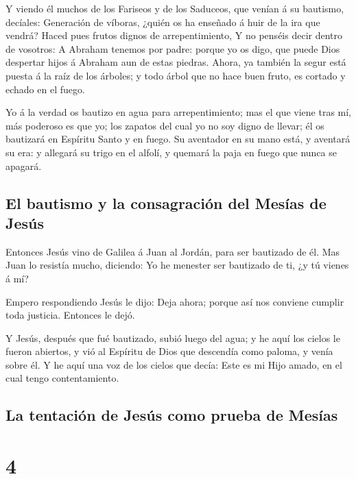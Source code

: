  Y viendo él muchos de los Fariseos y de los Saduceos, que
venían á su bautismo, decíales: Generación de víboras, ¿quién os ha
enseñado á huir de la ira que vendrá?  Haced pues frutos
dignos de arrepentimiento,  Y no penséis decir dentro de
vosotros: A Abraham tenemos por padre: porque yo os digo, que puede Dios
despertar hijos á Abraham aun de estas piedras.  Ahora,
ya también la segur está puesta á la raíz de los árboles; y todo árbol
que no hace buen fruto, es cortado y echado en el fuego.

 Yo á la verdad os bautizo en agua para arrepentimiento;
mas el que viene tras mí, más poderoso es que yo; los zapatos del cual
yo no soy digno de llevar; él os bautizará en Espíritu Santo y en fuego.
 Su aventador en su mano está, y aventará su era: y
allegará su trigo en el alfolí, y quemará la paja en fuego que nunca se
apagará.

\hypertarget{el-bautismo-y-la-consagraciuxf3n-del-mesuxedas-de-jesuxfas}{%
\subsection{El bautismo y la consagración del Mesías de
Jesús}\label{el-bautismo-y-la-consagraciuxf3n-del-mesuxedas-de-jesuxfas}}

 Entonces Jesús vino de Galilea á Juan al Jordán, para
ser bautizado de él.  Mas Juan lo resistía mucho,
diciendo: Yo he menester ser bautizado de ti, ¿y tú vienes á mí?

 Empero respondiendo Jesús le dijo: Deja ahora; porque
así nos conviene cumplir toda justicia. Entonces le dejó.

 Y Jesús, después que fué bautizado, subió luego del
agua; y he aquí los cielos le fueron abiertos, y vió al Espíritu de Dios
que descendía como paloma, y venía sobre él.  Y he aquí
una voz de los cielos que decía: Este es mi Hijo amado, en el cual tengo
contentamiento.

\hypertarget{la-tentaciuxf3n-de-jesuxfas-como-prueba-de-mesuxedas}{%
\subsection{La tentación de Jesús como prueba de
Mesías}\label{la-tentaciuxf3n-de-jesuxfas-como-prueba-de-mesuxedas}}

\hypertarget{section-3}{%
\section{4}\label{section-3}}

